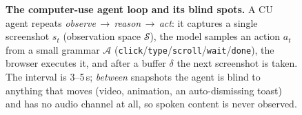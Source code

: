 \begin{figure}[t]
\begin{tikzpicture}
\end{tikzpicture}
\caption{\textbf{The computer-use agent loop and its blind spots.}
A CU agent repeats \emph{observe\,$\to$\,reason\,$\to$\,act}: it captures a
single screenshot $s_t$ (observation space $\mathcal{S}$), the model samples an
action $a_t$ from a small grammar $\mathcal{A}$
(\texttt{click}/\texttt{type}/\texttt{scroll}/\texttt{wait}/\texttt{done}), the
browser executes it, and after a buffer $\delta$ the next screenshot is taken.
The interval is 3--5\,s; \emph{between} snapshots the agent is blind to anything
that moves (video, animation, an auto-dismissing toast) and has no audio channel
at all, so spoken content is never observed.}
\label{fig:culoop}
\end{figure}
